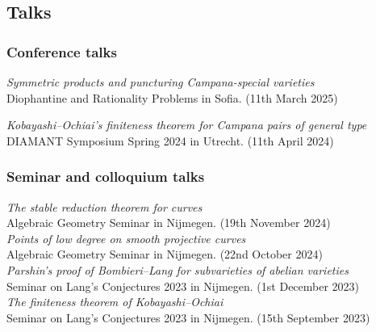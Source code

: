 \documentclass[paper=a4,fontsize=10pt,DIV=11,BCOR=3mm,pdftex]{scrartcl}
\begin{document}
\subsection*{Talks}

\subsubsection*{Conference talks}

\textit{Symmetric products and puncturing Campana-special varieties} \\
Diophantine and Rationality Problems in Sofia. (11th March 2025)

\textit{Kobayashi--Ochiai’s finiteness theorem for Campana pairs of general type} \\
DIAMANT Symposium Spring 2024 in Utrecht. (11th April 2024)

\subsubsection*{Seminar and colloquium talks}

\textit{The stable reduction theorem for curves} \\
Algebraic Geometry Seminar in Nijmegen. (19th November 2024) \\

\textit{Points of low degree on smooth projective curves} \\
Algebraic Geometry Seminar in Nijmegen. (22nd October 2024) \\

\textit{Parshin's proof of Bombieri--Lang for subvarieties of abelian varieties} \\
Seminar on Lang's Conjectures 2023 in Nijmegen. (1st December 2023) \\

\textit{The finiteness theorem of Kobayashi--Ochiai} \\
Seminar on Lang's Conjectures 2023 in Nijmegen. (15th September 2023)
\end{document}
